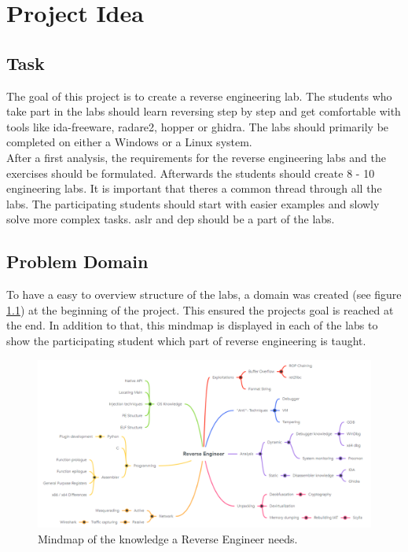 \chapter{Project Idea}
\section{Task}
\label{sec:task}
The goal of this project is to create a reverse engineering lab. The students who take part in the labs should learn reversing step by step and get comfortable with tools like \Gls{ida-freeware}, \Gls{radare2}, \Gls{hopper} or \Gls{ghidra}. The labs should primarily be completed on either a Windows or a Linux system. \\
After a first analysis, the requirements for the reverse engineering labs and the exercises should be formulated. Afterwards the students should create 8 - 10 engineering labs. It is important that theres a common thread through all the labs. The participating students should start with easier examples and slowly solve more complex tasks. \acrshort{aslr} and \acrshort{dep} should be a part of the labs.

\section{Problem Domain}
To have a easy to overview structure of the labs, a \gls{domain} was created (see figure \ref{fig:mindmap}) at the beginning of the project. This ensured the projects goal is reached at the end. In addition to that, this mindmap is displayed in each of the labs to show the participating student which part of reverse engineering is taught.
\begin{figure}[H]
    \includegraphics[width=\linewidth, center]{resources/RE_Domain_Light.png}
    \caption{Mindmap of the knowledge a Reverse Engineer needs.}
    \label{fig:mindmap}
\end{figure}

